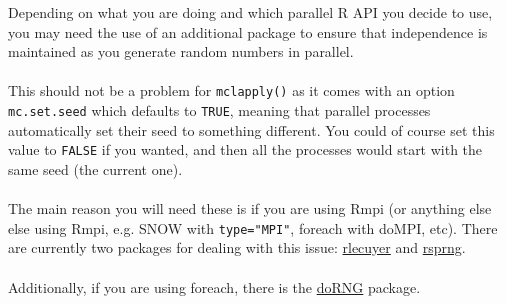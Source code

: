 Depending on what you are doing and which parallel R API you decide to use, you may need the use of an additional package to ensure that independence is maintained as you generate random numbers in parallel.  \\\\
%
This should not be a problem for \texttt{mclapply()} as it comes with an option \texttt{mc.set.seed} which defaults to \texttt{TRUE}, meaning that parallel processes automatically set their seed to something different.  You could of course set this value to \texttt{FALSE} if you wanted, and then all the processes would start with the same seed (the current one).\\\\
%
The main reason you will need these is if you are using Rmpi (or anything else else using Rmpi, e.g. SNOW with \texttt{type="MPI"}, foreach with doMPI, etc).  There are currently two packages for dealing with this issue:  \href{http://cran.r-project.org/web/packages/rlecuyer/index.html}{rlecuyer} and \href{http://cran.r-project.org/web/packages/rsprng/index.html}{rsprng}.\\\\
%
Additionally, if you are using foreach, there is the \href{http://cran.r-project.org/web/packages/doRNG/index.html}{doRNG} package.